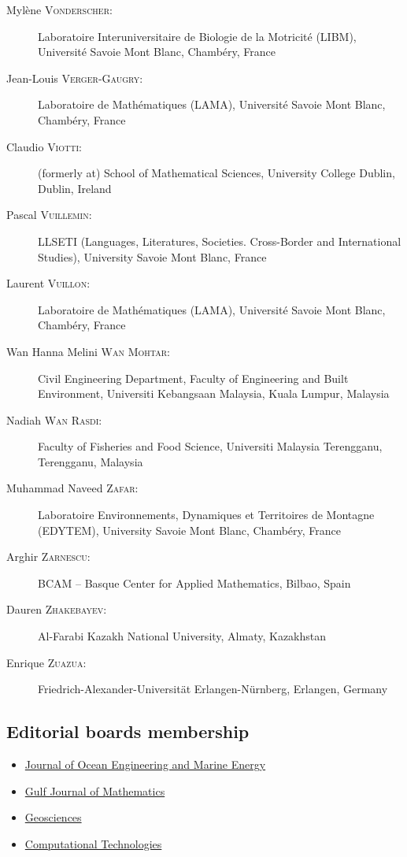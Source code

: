 \documentclass[final, a4paper, oneside, 12pt]{article}
\numberwithin{equation}{section}
\begin{document}
\begin{description}
  \item[Myl\`ene \textsc{Vonderscher}:] Laboratoire Interuniversitaire de Biologie de la Motricit\'e (LIBM), Universit\'e Savoie Mont Blanc, Chamb\'ery, France
  \item[Jean-Louis \textsc{Verger-Gaugry}:] Laboratoire de Math\'ematiques (LAMA), Universit\'e Savoie Mont Blanc, Chamb\'ery, France
  \item[Claudio \textsc{Viotti}:] (formerly at) School of Mathematical Sciences, University College Dublin, Dublin, Ireland
  \item[Pascal \textsc{Vuillemin}:] LLSETI (Languages, Literatures, Societies. Cross-Border and International Studies), University Savoie Mont Blanc, France
  \item[Laurent \textsc{Vuillon}:] Laboratoire de Math\'ematiques (LAMA), Universit\'e Savoie Mont Blanc, Chamb\'ery, France
  \item[Wan Hanna Melini \textsc{Wan Mohtar}:] Civil Engineering Department, Faculty of Engineering and Built Environment, Universiti Kebangsaan Malaysia, Kuala Lumpur, Malaysia
  \item[Nadiah \textsc{Wan Rasdi}:] Faculty of Fisheries and Food Science, Universiti Malaysia Terengganu, Terengganu, Malaysia
  \item[Muhammad Naveed \textsc{Zafar}:] Laboratoire Environnements, Dynamiques et Territoires de Montagne (EDYTEM), University Savoie Mont Blanc, Chamb\'ery, France 
  \item[Arghir \textsc{Zarnescu}:] BCAM -- Basque Center for Applied Mathematics, Bilbao, Spain
  \item[Dauren \textsc{Zhakebayev}:] Al-Farabi Kazakh National University, Almaty, Kazakhstan
  \item[Enrique \textsc{Zuazua}:] Friedrich-Alexander-Universität Erlangen-Nürnberg, Erlangen, Germany

\end{description}

\subsection{Editorial boards membership}

\begin{itemize}

  \item \href{https://www.springer.com/engineering/civil+engineering/journal/40722}{Journal of Ocean Engineering and Marine Energy}
  \item \href{https://gjom.org/index.php/gjom}{Gulf Journal of Mathematics}
  \item \href{https://www.mdpi.com/journal/geosciences/}{Geosciences}
  \item \href{http://www.ict.nsc.ru/jct/}{Computational Technologies}
  
\end{itemize}
\end{document}
